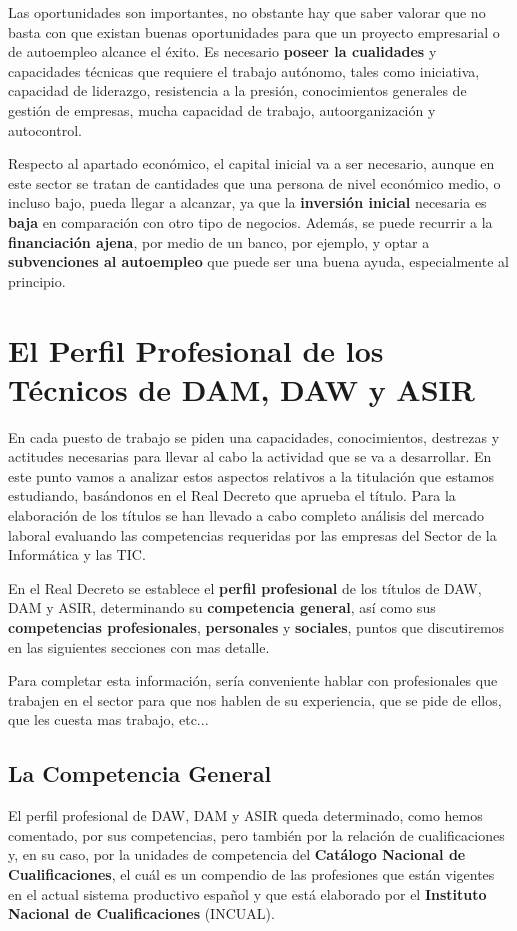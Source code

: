 Las oportunidades son importantes, no obstante hay que saber valorar que no basta con que existan buenas oportunidades para que un proyecto empresarial o de autoempleo alcance el éxito. Es necesario\textbf{ poseer la cualidades} y capacidades técnicas que requiere el trabajo autónomo, tales como iniciativa, capacidad de liderazgo, resistencia a la presión, conocimientos generales de gestión de empresas, mucha capacidad de trabajo, autoorganización y autocontrol.

Respecto al apartado económico, el capital inicial va a ser necesario, aunque en este sector se tratan de cantidades que una persona de nivel económico medio, o incluso bajo, pueda llegar a alcanzar, ya que la \textbf{inversión inicial} necesaria es \textbf{baja} en comparación con otro tipo de negocios. Además, se puede recurrir a la \textbf{financiación ajena}, por medio de un banco, por ejemplo, y optar a \textbf{subvenciones al autoempleo} que puede ser una buena ayuda, especialmente al principio.

\section{El Perfil Profesional de los Técnicos de DAM, DAW y ASIR}
En cada puesto de trabajo se piden una capacidades, conocimientos, destrezas y actitudes necesarias para llevar al cabo la actividad que se va a desarrollar. En este punto vamos a analizar estos aspectos relativos a la titulación que estamos estudiando, basándonos en el Real Decreto que aprueba el título. Para la elaboración de los títulos se han llevado a cabo completo análisis del mercado laboral evaluando las competencias requeridas por las empresas del Sector de la Informática y las TIC.

En el Real Decreto se establece el \textbf{\gls{perfil profesional}} de los títulos de DAW, DAM y ASIR, determinando su \textbf{competencia general}, así como sus \textbf{competencias profesionales}, \textbf{personales} y \textbf{sociales}, puntos que discutiremos en las siguientes secciones con mas detalle.

Para completar esta información, sería conveniente hablar con profesionales que trabajen en el sector para que nos hablen de su experiencia, que se pide de ellos, que les cuesta mas trabajo, etc...

\subsection{La Competencia General}
El perfil profesional de DAW, DAM y ASIR queda determinado, como hemos comentado, por sus competencias, pero también por la relación de cualificaciones y, en su caso, por la unidades de competencia del \textbf{Catálogo Nacional de Cualificaciones}, el cuál es un compendio de las profesiones que están vigentes en el actual sistema productivo español y que está elaborado por el \textbf{Instituto Nacional de Cualificaciones} (INCUAL).

